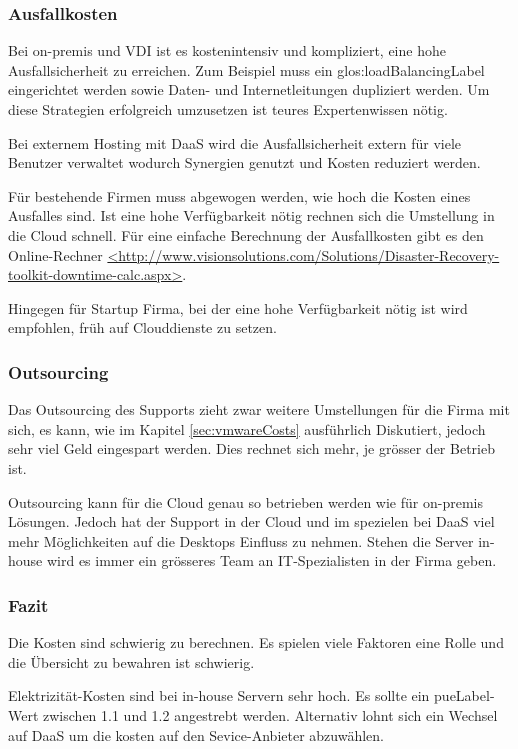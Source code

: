 \subsubsection{Ausfallkosten}
Bei on-premis und VDI ist es kostenintensiv und kompliziert, eine hohe Ausfallsicherheit zu erreichen. Zum Beispiel muss ein \gls{glos:loadBalancingLabel} eingerichtet werden sowie Daten- und Internetleitungen dupliziert werden. Um diese Strategien erfolgreich umzusetzen ist teures Expertenwissen nötig.

Bei externem Hosting mit DaaS wird die Ausfallsicherheit extern für viele Benutzer verwaltet wodurch Synergien genutzt und Kosten reduziert werden.

Für bestehende Firmen muss abgewogen werden, wie hoch die Kosten eines Ausfalles sind. Ist eine hohe Verfügbarkeit nötig rechnen sich die Umstellung in die Cloud schnell. Für eine einfache Berechnung der Ausfallkosten gibt es den Online-Rechner \url{<http://www.visionsolutions.com/Solutions/Disaster-Recovery-toolkit-downtime-calc.aspx>}.

Hingegen für Startup Firma, bei der eine hohe Verfügbarkeit nötig ist wird empfohlen, früh auf Clouddienste zu setzen.

\subsubsection{Outsourcing}
Das Outsourcing des Supports zieht zwar weitere Umstellungen für die Firma mit sich, es kann, wie im Kapitel \cref{sec:vmwareCosts} ausführlich Diskutiert, jedoch sehr viel Geld eingespart werden. Dies rechnet sich mehr, je grösser der Betrieb ist.

Outsourcing kann für die Cloud genau so betrieben werden wie für on-premis Lösungen. Jedoch hat der Support in der Cloud und im spezielen bei DaaS viel mehr Möglichkeiten auf die Desktops Einfluss zu nehmen. Stehen die Server in-house wird es immer ein grösseres Team an IT-Spezialisten in der Firma geben.

\subsubsection{Fazit}
Die Kosten sind schwierig zu berechnen. Es spielen viele Faktoren eine Rolle und die Übersicht zu bewahren ist schwierig.

Elektrizität-Kosten sind bei in-house Servern sehr hoch. Es sollte ein \Gls{pueLabel}-Wert zwischen 1.1 und 1.2 angestrebt werden. Alternativ lohnt sich ein Wechsel auf DaaS um die kosten auf den Sevice-Anbieter abzuwählen.

